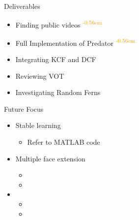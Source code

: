 \documentclass[mathserif, 14pt, xcolor=svgnames]{beamer}
\begin{document}
\begin{frame}[label=deliverables]{Deliverables}
  \begin{itemize}
    \setlength\itemsep{1.2em}
     \item 
        \pause Finding public videos
          \pause \textcolor{orange}{ }\textsuperscript{\textcolor{orange}{\kern-0.56em\small{}}}
     \item 
        \pause Full Implementation of Predator
          \pause \textcolor{orange}{ }\textsuperscript{\textcolor{orange}{\kern-0.56em\small{}}}
        \pause \item Integrating KCF and DCF \pause \textcolor{green}{ }
        \pause \item Reviewing VOT \pause \textcolor{green}{ }
        \pause \item Investigating Random Ferns \pause \textcolor{red}{ }
  \end{itemize}
\end{frame}

\bgroup
\begin{frame}{Future Focus}
    \begin{itemize}
      \setlength\itemsep{1.4em}
       \item \hspace{0pt}
         \pause Stable learning
          \begin{itemize}
            \setlength\itemsep{1.4em}
             \item \hspace{0pt}
               \pause Refer to MATLAB code
          \end{itemize}
       \item \hspace{0pt}
         \pause Multiple face extension
          \begin{itemize}
            \setlength\itemsep{1.4em}
             \item \hspace{0pt}
             \item \hspace{0pt}
          \end{itemize}
          \pause
       \item \hspace{0pt}
         \pause {}
          \begin{itemize}
            \setlength\itemsep{1.4em}
             \item \hspace{0pt}
               \pause {}
             \item \hspace{0pt}
               \pause {}
          \end{itemize}
    \end{itemize}
\end{frame}
\egroup
\end{document}

